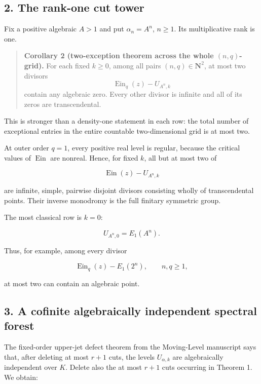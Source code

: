 \subsection{2. The rank-one cut tower}

Fix a positive algebraic \(A>1\) and put \(\alpha_n=A^n\), \(n\geq1\).
Its multiplicative rank is one.

\begin{quote}
\textbf{Corollary 2 (two-exception theorem across the whole \((n,q)\)-grid).}
For each fixed \(k\geq0\), among all pairs \((n,q)\in\mathbf N^2\), at
most two divisors
\[
 \operatorname{Ein}_q(z)-U_{A^n,k}
\]
contain any algebraic zero. Every other divisor is infinite and all of
its zeros are transcendental.
\end{quote}

This is stronger than a density-one statement in each row: the total number
of exceptional entries in the entire countable two-dimensional grid is at
most two.

At outer order \(q=1\), every positive real level is regular, because the
critical values of \(\operatorname{Ein}\) are nonreal. Hence, for fixed
\(k\), all but at most two of

\[
 \operatorname{Ein}(z)-U_{A^n,k}
\]

are infinite, simple, pairwise disjoint divisors consisting wholly of
transcendental points. Their inverse monodromy is the full finitary
symmetric group.

The most classical row is \(k=0\):

\[
 U_{A^n,0}=E_1(A^n).
\]

Thus, for example, among every divisor

\[
 \operatorname{Ein}_q(z)-E_1(2^n),
 \qquad n,q\geq1,
\]

at most two can contain an algebraic point.

\subsection{3. A cofinite algebraically independent spectral forest}

The fixed-order upper-jet defect theorem from the Moving-Level manuscript
says that, after deleting at most \(r+1\) cuts, the levels
\(U_{\alpha,k}\) are algebraically independent over \(K\). Delete also the
at most \(r+1\) cuts occurring in Theorem 1. We obtain:


